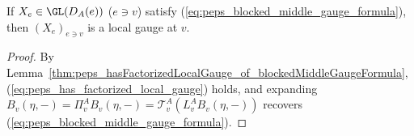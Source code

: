 \begin{lemma}%
    \label{thm:peps_localGauge_exists_of_blockedMiddleGaugeFormula}
    \leanok
    If $X_e\in\GL(D_A(e))$ ($e\ni v$) satisfy (\ref{eq:peps_blocked_middle_gauge_formula}), then $(X_e)_{e\ni v}$ is a local gauge at $v$.
\end{lemma}
\begin{proof}\leanok
    By Lemma~\ref{thm:peps_hasFactorizedLocalGauge_of_blockedMiddleGaugeFormula}, (\ref{eq:peps_has_factorized_local_gauge}) holds, and expanding $B_v(\eta,-)=\Pi^A_vB_v(\eta,-)=\mathcal T^A_v(L^A_vB_v(\eta,-))$ recovers (\ref{eq:peps_blocked_middle_gauge_formula}).
\end{proof}
